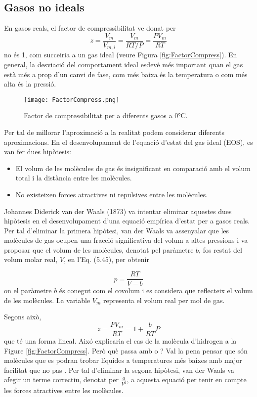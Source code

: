 %


\subsection{Gasos no ideals}



En gasos reals, el factor de compressibilitat ve donat per
\[z=\frac{V_m}{V_{m,i}}=\frac{V_m}{RT/P}=\frac{PV_m}{RT}\]
no és 1, com succeiria a un gas ideal (veure Figura \ref{fig:FactorCompress}). En general, la desviació del comportament ideal esdevé més important quan el gas està més a prop d'un canvi de fase, com més baixa és la temperatura o com més alta és la pressió. 
\begin{figure}[h]
\centering
\texttt{[image: FactorCompress.png]}
\caption{Factor de compressibilitat per a diferents gasos a 0\si\degreeCelsius.}
\label{a}
\end{figure}

Per tal de millorar l'aproximació a la realitat podem considerar diferents aproximacions. 
En el desenvolupament de l'equació d'estat del gas ideal (EOS), es van fer dues hipòtesis:

\begin{itemize}
    \item El volum de les molècules de gas és insignificant en comparació amb el volum total i la distància entre les molècules.
    \item No existeixen forces atractives ni repulsives entre les molècules.
\end{itemize}

Johannes Diderick van der Waals (1873) va intentar eliminar aquestes dues hipòtesis en el desenvolupament d'una equació empírica d'estat per a gasos reals. Per tal d'eliminar la primera hipòtesi, van der Waals va assenyalar que les molècules de gas ocupen una fracció significativa del volum a altes pressions i va proposar que el volum de les molècules, denotat pel paràmetre $b$, fos restat del volum molar real, $V$, en l'Eq. (5.45), per obtenir

\[
p = \frac{RT}{V - b}
\]
on el paràmetre $b$ és conegut com el covolum i es considera que reflecteix el volum de les molècules. La variable $V_m$ representa el volum real per mol de gas.

Segons això,
\[z=\frac{PV_m}{RT}=1+\frac{b}{RT}P\]
que té una forma lineal. Aixó explicaria el cas de la molècula d'hidrogen a la Figure \ref{fig:FactorCompress}.
Però què passa amb  o ? Val la pena pensar que són molècules que es podran trobar líquides a temperatures més baixes amb major facilitat que no pas . 
Per tal d'eliminar la segona hipòtesi, van der Waals va afegir un terme correctiu, denotat per $\frac{a}{V^2}$, a aquesta equació per tenir en compte les forces atractives entre les molècules.

